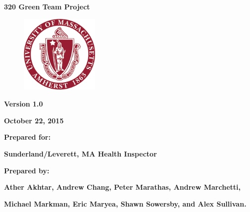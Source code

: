 \documentclass[twoside,letterpaper]{article}
\begin{document}
\clearpage\setcounter{page}{1}\pagestyle{Standard}
\thispagestyle{FirstPage}


\bigskip

{\centering{}\bfseries\color{black}
320 Green Team Project
\par}


\bigskip


\begin{figure}
\centering
\includegraphics[width=1.5in,height=1.5in]{Uma_seal.png}
\end{figure}

\bigskip


\bigskip

{\centering{}\bfseries\color{black}
Version 1.0
\par}

{\centering{}\bfseries\color{black}
October 22, 2015
\par}


\bigskip


\bigskip

{\centering{}\bfseries\color{black}
Prepared for:
\par}

{\centering{}\bfseries\color{black}
Sunderland/Leverett, MA Health Inspector
\par}


\bigskip


\bigskip

{\centering{}\bfseries\color{black}
Prepared by:
\par}

{\centering{}\bfseries\color{black}
Ather Akhtar, Andrew Chang, Peter Marathas, Andrew Marchetti, \par} 
{\centering{}\bfseries\color{black}
 Michael Markman, Eric Maryea, Shawn Sowersby, and Alex Sullivan.
\par}
\end{document}
